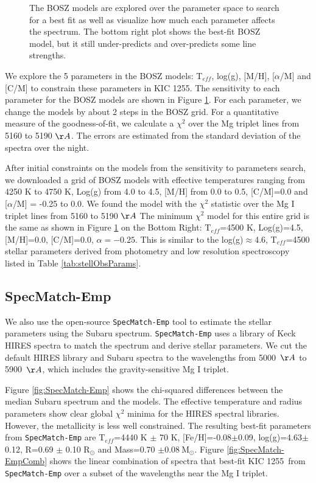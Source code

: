 \documentclass[preprint,trackchanges]{aastex61}
\newcommand{\shStar}{KIC 1255}
\begin{document}
\begin{figure}[!hbtp]
\begin{centering}
\caption{The BOSZ models are explored over the parameter space to search for a best fit as well as visualize how much each parameter affects the spectrum.
The bottom right plot shows the best-fit BOSZ model, but it still under-predicts and over-predicts some line strengths.}\label{fig:boszModelParamsMedianSpec}
\end{centering}
\end{figure}

We explore the 5 parameters in the BOSZ models: T$_{eff}$, log(g), [M/H], [$\alpha$/M] and [C/M] to constrain these parameters in \shStar.
The sensitivity to each parameter for the BOSZ models are shown in Figure \ref{fig:boszModelParamsMedianSpec}.
For each parameter, we change the models by about 2 steps in the BOSZ grid.
For a quantitative measure of the goodness-of-fit, we calculate a $\chi^2$ over the Mg triplet lines from 5160 to 5190 $\AA$.
The errors are estimated from the standard deviation of the spectra over the night.

After initial constraints on the models from the sensitivity to parameters search, we downloaded a grid of BOSZ models with effective temperatures ranging from 4250 K to 4750 K, Log(g) from 4.0 to 4.5, [M/H] from 0.0 to 0.5, [C/M]=0.0 and [$\alpha$/M] = -0.25 to 0.0.
We found the model with the  $\chi^2$ statistic over the Mg I triplet lines from 5160 to 5190 $\AA$
The minimum $\chi^2$ model for this entire grid is the same as shown in Figure \ref{fig:boszModelParamsMedianSpec} on the Bottom Right: T$_{eff}$=4500 K, Log(g)=4.5, [M/H]=0.0, [C/M]=0.0, $\alpha=-0.25$.
This is similar to the log(g)$\approx$4.6, T$_{eff}$=4500 stellar parameters derived from photometry and low resolution spectroscopy listed in Table \ref{tab:stellObsParams}.

\subsection{SpecMatch-Emp}\label{sec:SpecMatch-Emp}

We also use the open-source \texttt{SpecMatch-Emp} tool \citep{yee2017specMatch} to estimate the stellar parameters using the Subaru spectrum.
\texttt{SpecMatch-Emp} uses a library of Keck HIRES spectra to match the spectrum and derive stellar parameters.
We cut the default HIRES library and Subaru spectra to the wavelengths from 5000~$\AA$ to 5900~$\AA$, which includes the gravity-sensitive Mg I triplet.

Figure \ref{fig:SpecMatch-Emp} shows the chi-squared differences between the median Subaru spectrum and the models.
The effective temperature and radius parameters show clear global $\chi^2$ minima for the HIRES spectral libraries.
However, the metallicity is less well constrained.
The resulting best-fit parameters from \texttt{SpecMatch-Emp} are T$_{eff}$=4440 K $\pm$ 70 K, [Fe/H]=-0.08$\pm$0.09, log(g)=4.63$\pm$0.12, R=0.69 $\pm$ 0.10 R$_\odot$ and Mass=0.70 $\pm 0.08~$M$_\odot$.
Figure \ref{fig:SpecMatch-EmpComb} shows the linear combination of spectra that best-fit \shStar\ from \texttt{SpecMatch-Emp} over a subset of the wavelengths near the Mg I triplet.
\end{document}
